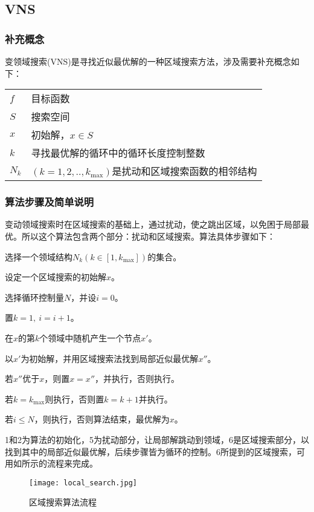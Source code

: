 \subsection{VNS}
\subsubsection{补充概念}
变领域搜索(VNS)是寻找近似最优解的一种区域搜索方法，涉及需要补充概念如下：

\begin{tabular}{ll}
$f$ & 目标函数\\
$S$ & 搜索空间 \\
$x$ & 初始解，$x\in S$\\
$k$ & 寻找最优解的循环中的循环长度控制整数\\
$N_k$ & $(k = 1,2,..,k_{\max})$是扰动和区域搜索函数的相邻结构
\end{tabular}
\subsubsection{算法步骤及简单说明}
变动领域搜索时在区域搜索的基础上，通过扰动，使之跳出区域，以免困于局部最优。所以这个算法包含两个部分：扰动和区域搜索。算法具体步骤如下：
\begin{asparaenum}
\renewcommand{\labelenumi}{\heiti 步骤\theenumi~}
\item 选择一个领域结构$N_k(k\in [1,k_{\max}])$的集合。
\item 设定一个区域搜索的初始解$x$。
\item 选择循环控制量$N$，并设$i=0$。
\item 置$k = 1,\ i = i+1$。
\item 在$x$的第$k$个领域中随机产生一个节点$x'$。
\item 以$x'$为初始解，并用区域搜索法找到局部近似最优解$x''$。
\item 若$x''$优于$x$，则置$x = x''$，并执行，否则执行。
\item 若$k = k_{\max}$则执行，否则置$k = k+1$并执行。
\item 若$i\leqslant N$，则执行，否则算法结束，最优解为$x$。
\end{asparaenum}

\Step1和\Step2为算法的初始化，\Step5为扰动部分，让局部解跳动到领域，\Step6是区域搜索部分，以找到其中的局部近似最优解，后续步骤皆为循环的控制。\Step6所提到的区域搜索，可用如所示的流程来完成。
\begin{figure}[h]
\centering
\texttt{[image: local\_search.jpg]}
\caption{区域搜索算法流程\label{fig:local_search}}
\end{figure}
